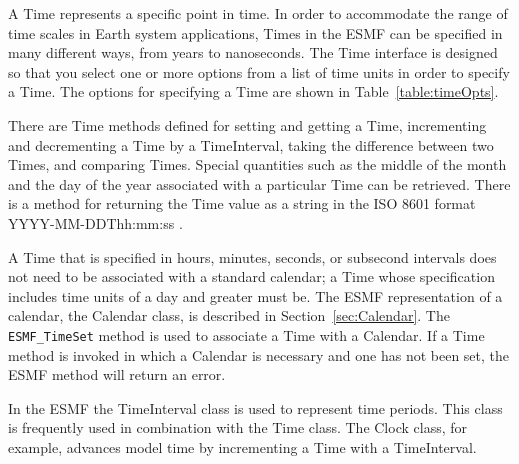 \label{sec:Time}

A Time represents a specific point in time.  In order to accommodate
the range of time scales in Earth system applications, Times in
the ESMF can be specified in many different ways, from years to 
nanoseconds.  The Time interface is designed so that you select one or 
more options from a list of time units in order to specify a 
Time. The options for specifying a Time are shown in 
Table~\ref{table:timeOpts}.  

There are Time methods defined for setting and getting a
Time, incrementing and decrementing a Time by a TimeInterval,
taking the difference between two Times, and comparing Times.
Special quantities such as the middle of the month and the 
day of the year associated with a particular Time can be retrieved. 
There is a method for returning the Time value as a string in 
the ISO 8601 format YYYY-MM-DDThh:mm:ss \cite{ISO}.

A Time that is specified in hours, minutes, seconds, or subsecond intervals 
does not need to be associated with a standard calendar; a Time whose
specification includes time units of a day and greater must be.  The 
ESMF representation
of a calendar, the Calendar class, is described in Section~\ref{sec:Calendar}.
The {\tt ESMF\_TimeSet} method is used to associate a Time with a 
Calendar.  If a Time method is invoked in which a Calendar is 
necessary and one has not been set, the ESMF method will return an error.

In the ESMF the TimeInterval class is used to represent time periods.
This class is frequently used in combination with the Time class.
The Clock class, for example, advances model time by incrementing a
Time with a TimeInterval. 
 




